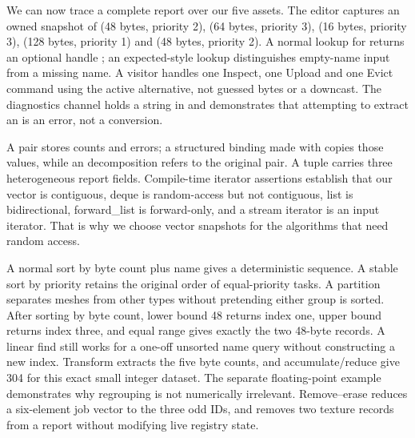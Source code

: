 \hypertarget{05-engine-i-ch006-putting-the-entire-pipeline-together-without-losing-the-guarantees-we-already-earned}{}

We can now trace a complete report over our five assets. The editor captures an owned snapshot of  (48 bytes, priority 2),  (64 bytes, priority 3),  (16 bytes, priority 3),  (128 bytes, priority 1) and  (48 bytes, priority 2). A normal lookup for  returns an optional handle ; an expected-style lookup distinguishes empty-name input from a missing name. A visitor handles one Inspect, one Upload and one Evict command using the active  alternative, not guessed bytes or a downcast. The diagnostics channel holds a string in  and demonstrates that attempting to extract an  is an error, not a conversion.

A pair stores counts and errors; a structured binding made with  copies those values, while an  decomposition refers to the original pair. A tuple carries three heterogeneous report fields. Compile-time iterator assertions establish that our vector is contiguous, deque is random-access but not contiguous, list is bidirectional, forward\_list is forward-only, and a stream iterator is an input iterator. That is why we choose vector snapshots for the algorithms that need random access.

A normal sort by byte count plus name gives a deterministic sequence. A stable sort by priority retains the original order of equal-priority tasks. A partition separates meshes from other types without pretending either group is sorted. After sorting by byte count, lower bound 48 returns index one, upper bound returns index three, and equal range gives exactly the two 48-byte records. A linear find still works for a one-off unsorted name query without constructing a new index. Transform extracts the five byte counts, and accumulate/reduce give 304 for this exact small integer dataset. The separate floating-point example demonstrates why regrouping is not numerically irrelevant. Remove--erase reduces a six-element job vector to the three odd IDs, and  removes two texture records from a report without modifying live registry state.

